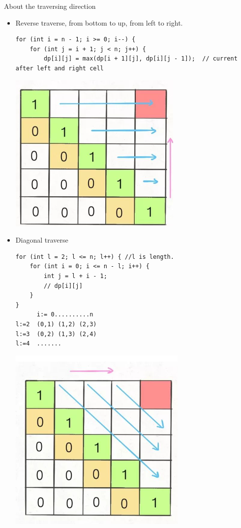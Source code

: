 \documentclass[a4paper,11pt,twoside]{book}
\begin{document}
\par About the traversing direction 
\begin{itemize}

	\item  Reverse traverse, from bottom to up, from left to right.
\begin{lstlisting}
for (int i = n - 1; i >= 0; i--) {
	for (int j = i + 1; j < n; j++) {
		dp[i][j] = max(dp[i + 1][j], dp[i][j - 1]);	 // current after left and right cell
\end{lstlisting}

\begin{center}
	\includegraphics[scale=0.40]{pics/mr.png}
\end{center}

	\item Diagonal traverse
\begin{lstlisting}
for (int l = 2; l <= n; l++) { //l is length.
	for (int i = 0; i <= n - l; i++) {
		int j = l + i - 1;
		// dp[i][j]
	}
}
      i:= 0..........n
l:=2  (0,1) (1,2) (2,3)
l:=3  (0,2) (1,3) (2,4)
l:=4  .......
\end{lstlisting}
		
\begin{center}
	\includegraphics[scale=0.40]{pics/md.png}
\end{center}		
	 

\end{itemize}
\end{document}
